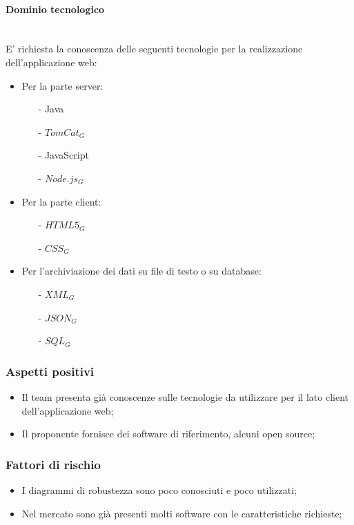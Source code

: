 			\paragraph{Dominio tecnologico}
			\mbox{}\\
			E' richiesta la conoscenza delle seguenti tecnologie per la realizzazione dell'applicazione web:
				\begin{itemize}
					\item Per la parte server:
					\begin{itemize}
						\item[-] Java
						\item[-] $TomCat_G$
						\item[-] JavaScript
						\item[-] $Node.js_G$
					\end{itemize}
					\item Per la parte client:
					\begin{itemize}
						\item[-] $HTML5_G$
						\item[-] $CSS_G$
					\end{itemize}
					\item Per l'archiviazione dei dati su file di testo o su database:
					\begin{itemize}
						\item[-] $XML_G$
						\item[-] $JSON_G$
						\item[-] $SQL_G$
					\end{itemize}
				\end{itemize}
		\subsubsection{Aspetti positivi}
		\begin{itemize}
			\item Il team presenta già conoscenze sulle tecnologie da utilizzare per il lato client dell'applicazione web;
			\item Il proponente fornisce dei software di riferimento, alcuni open source;
		\end{itemize}
		\subsubsection{Fattori di rischio}
		\begin{itemize}
			\item I diagrammi di robustezza sono poco conosciuti e poco utilizzati;
			\item Nel mercato sono già presenti molti software con le caratteristiche richieste;
		\end{itemize}
